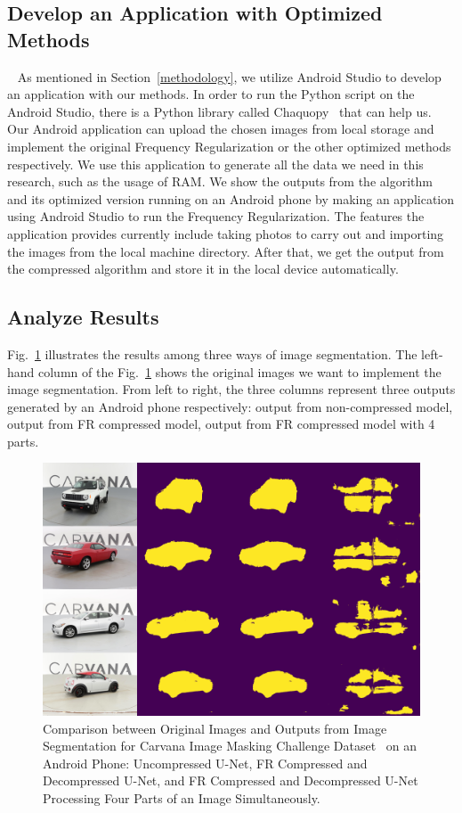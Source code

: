 \documentclass[runningheads]{llncs}
\begin{document}
\subsection{Develop an Application with Optimized Methods}~\label{deploy_as}
As mentioned in Section~\ref{methodology}, we utilize Android Studio to develop an application with our methods. In order to run the Python script on the Android Studio, there is a Python library called Chaquopy~\cite{chaquopy2023} that can help us. Our Android application can upload the chosen images from local storage and implement the original Frequency Regularization or the other optimized methods respectively. We use this application to generate all the data we need in this research, such as the usage of RAM. We show the outputs from the algorithm and its optimized version running on an Android phone by making an application using Android Studio to run the Frequency Regularization. The features the application provides currently include taking photos to carry out and importing the images from the local machine directory. After that, we get the output from the compressed algorithm and store it in the local device automatically.

\subsection{Analyze Results}
Fig.~\ref{image:3_outputs} illustrates the results among three ways of image segmentation. The left-hand column of the Fig.~\ref{image:3_outputs} shows the original images we want to implement the image segmentation. From left to right, the three columns represent three outputs generated by an Android phone respectively: output from non-compressed model, output from FR compressed model, output from FR compressed model with 4 parts. 
\begin{figure}[htbp]
	\centering
	\label{image:3_outputs}
	\includegraphics[width=0.8\linewidth]{figures/3_outputs.png}
	\caption{Comparison between Original Images and Outputs from Image Segmentation for Carvana Image Masking Challenge Dataset~\cite{brian2017carvanadataset} on an Android Phone: Uncompressed U-Net, FR Compressed and Decompressed U-Net, and FR Compressed and Decompressed U-Net Processing Four Parts of an Image Simultaneously.}
\end{figure}
\end{document}
